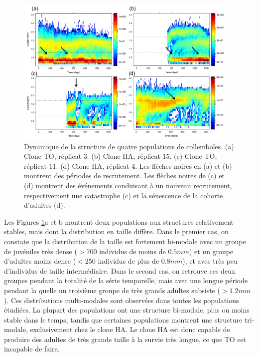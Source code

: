 \begin{figure}[!ht]
\begin{center}
\includegraphics[width=0.95\textwidth]{1_CorpsDeThese/Resumes/Fig/SP01}
\caption[Dynamiques de la
structure de 4 populations]{Dynamique de la structure de quatre populations de
collemboles. (a) Clone TO, réplicat 3. (b) Clone HA, réplicat 15. (c) Clone TO,
réplicat 11. (d) Clone HA, réplicat 4. Les flèches noires en (a) et (b) montrent
des périodes de recrutement. Les flèches noires de (c) et (d) montrent des
événements conduisant à un nouveau recrutement, respectivement une catastrophe
(c) et la sénescence de la cohorte d'adultes (d).}
\label{fig:SP1}
\end{center}
\end{figure}

Les Figures \ref{fig:SP1}a et b montrent deux populations aux structures
relativement stables, mais dont la distribution en taille diffère. Dans le
premier cas, on constate que la distribution de la taille est fortement
bi-modale avec un groupe de juvéniles très dense ($>700$ individus de moins de
$0.5mm$) et un groupe d'adultes  moins dense ($<250$ individus de plus de
$0.8mm$), et avec très peu d'individus de taille intermédiaire. Dans le second
cas, on retrouve ces deux groupes pendant la totalité de la série temporelle, mais avec une
longue période pendant la quelle un troisième groupe de très grands adultes
subsiste ($>1.2mm$). Ces distributions multi-modales sont observées dans toutes
les populations étudiées. La plupart des populations ont une structure bi-modale,
plus ou moins stable dans le temps, tandis que certaines populations montrent
une structure tri-modale, exclusivement chez le clone HA. Le clone HA est donc
capable de produire des adultes de très grande taille à la survie très longue,
ce que TO est incapable de faire.

